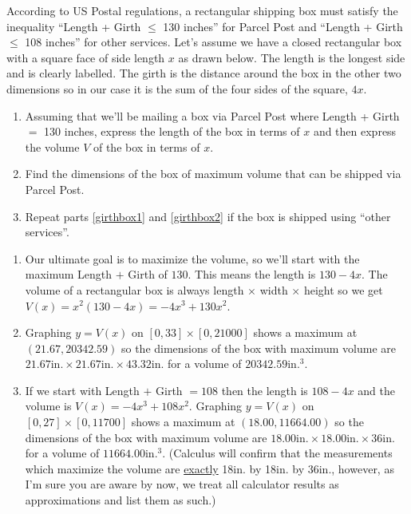 {According to US Postal regulations, a rectangular shipping box must satisfy the inequality ``Length + Girth $\leq$ 130 inches'' for Parcel Post and ``Length + Girth $\leq$ 108 inches'' for other services. Let's assume we have a closed rectangular box with a square face of side length $x$ as drawn below.  The length is the longest side and is clearly labelled.  The girth is the distance around the box in the other two dimensions so in our case it is the sum of the four sides of the square, $4x$.  

\begin{enumerate}

\item \label{girthbox1} Assuming that we'll be mailing a box via Parcel Post where Length + Girth $=$ 130 inches, express the length of the box in terms of $x$ and then express the volume $V$ of the box in terms of $x$.

\item \label{girthbox2} Find the dimensions of the box of maximum volume that can be shipped via Parcel Post.

\item Repeat parts \ref{girthbox1} and \ref{girthbox2} if the box is shipped using ``other services''.

\end{enumerate}

\begin{center}
\end{center}
}
{\begin{enumerate}

\item Our ultimate goal is to maximize the volume, so we'll start with the maximum Length $+$ Girth of $130.$  This means the length is $130 - 4x$.  The volume of a rectangular box is always length $\times$ width $\times$ height so we get $V(x) = x^{2}(130 - 4x) = -4x^{3} + 130x^{2}$.  

\item Graphing $y = V(x)$ on $[0, 33] \times [0, 21000]$ shows a maximum at $(21.67, 20342.59)$ so the dimensions of the box with maximum volume are $21.67\mbox{in.} \times 21.67\mbox{in.} \times 43.32\mbox{in.}$ for a volume of $20342.59\mbox{in.}^{3}$.

\item If we start with Length $+$ Girth $= 108$ then the length is $108 - 4x$ and the volume is $V(x) = -4x^{3} + 108x^{2}$.  Graphing $y = V(x)$ on $[0, 27] \times [0, 11700]$ shows a maximum at $(18.00, 11664.00)$ so the dimensions of the box with maximum volume are $18.00\mbox{in.} \times 18.00\mbox{in.} \times 36\mbox{in.}$ for a volume of $11664.00\mbox{in.}^{3}$.  (Calculus will confirm that the measurements which maximize the volume are \underline{exactly} 18in. by 18in. by 36in., however, as I'm sure you are aware by now, we treat all calculator results as approximations and list them as such.)

\end{enumerate}
}